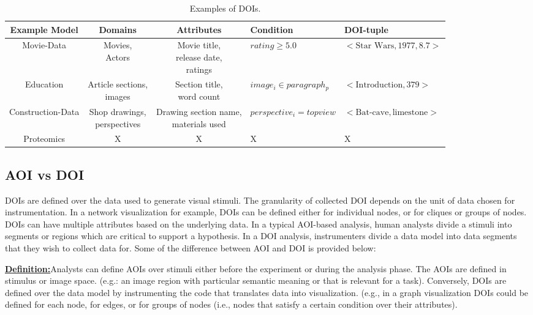 \begin{table*}[htbp]
	\centering
		\begin{tabular}{|c|c|c|l|l|}
			\hline
	Example Model & Domains & Attributes & Condition& DOI-tuple\\\hline
	Movie-Data & \shortstack{Movies,\\ Actors} & \shortstack{Movie title,\\ release date,\\ ratings}& $rating \geq 5.0$& $<\text{Star Wars}, 1977, 8.7>$ \\\hline
	Education & \shortstack{Article sections,\\ images} & \shortstack{Section title,\\ word count} & $image_i \in paragraph_p$& $<\text{Introduction}, 379>$ \\\hline
	Construction-Data & \shortstack{Shop drawings,\\ perspectives} & \shortstack{Drawing section name,\\ materials used} & $perspective_i =topview$& $<\text{Bat-cave}, \text{limestone}>$ \\\hline
	Proteomics & X& X& X& X \\\hline
		\end{tabular}
		\caption{Examples of DOIs.}
		\label{tab:ExampleDOI}
\end{table*}

\subsection{AOI vs DOI}

DOIs are defined over the data used to generate visual stimuli. The granularity of collected DOI depends on the unit of data chosen for instrumentation. In a network visualization for example, DOIs can be defined either for individual nodes, or for cliques or groups of nodes. DOIs can have multiple attributes based on the underlying data. 
In a typical AOI-based analysis, human analysts divide a stimuli into segments or regions which are critical to support a hypothesis. In a DOI analysis, instrumenters divide a data model into data segments that they wish to collect data for. Some of the difference between AOI and DOI is provided below: 

\textbf{\underline{Definition:}}Analysts can define AOIs over stimuli either before the experiment or during the analysis phase. The AOIs are defined in stimulus or image space. (e.g.: an image region with particular semantic meaning or that is relevant for a task). Conversely, DOIs are defined over the data model by instrumenting the code that translates data into visualization.   (e.g., in a graph visualization DOIs could be defined for each node, for edges, or for groups of nodes (i.e., nodes that satisfy a certain condition over their attributes).


